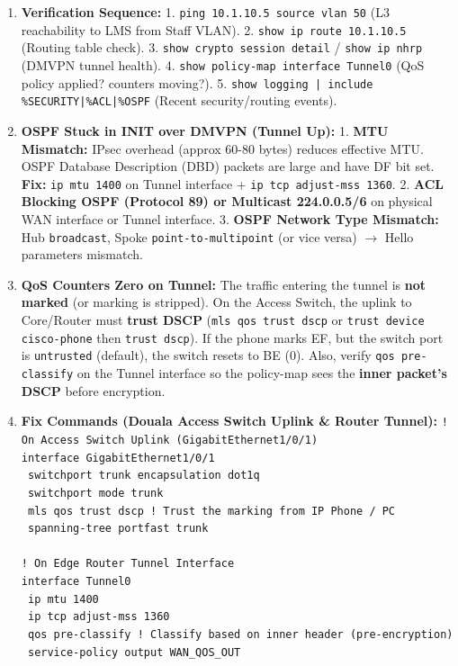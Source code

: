 \documentclass[11pt]{article}
\begin{document}
\begin{corrige}
\begin{enumerate}
    \item \textbf{Verification Sequence:}
        1. \texttt{ping 10.1.10.5 source vlan 50} (L3 reachability to LMS from Staff VLAN).
        2. \texttt{show ip route 10.1.10.5} (Routing table check).
        3. \texttt{show crypto session detail} / \texttt{show ip nhrp} (DMVPN tunnel health).
        4. \texttt{show policy-map interface Tunnel0} (QoS policy applied? counters moving?).
        5. \texttt{show logging | include \%SECURITY|\%ACL|\%OSPF} (Recent security/routing events).
    \item \textbf{OSPF Stuck in INIT over DMVPN (Tunnel Up):}
        1. \textbf{MTU Mismatch:} IPsec overhead (approx 60-80 bytes) reduces effective MTU. OSPF Database Description (DBD) packets are large and have DF bit set. \textbf{Fix:} \texttt{ip mtu 1400} on Tunnel interface + \texttt{ip tcp adjust-mss 1360}.
        2. \textbf{ACL Blocking OSPF (Protocol 89) or Multicast 224.0.0.5/6} on physical WAN interface or Tunnel interface.
        3. \textbf{OSPF Network Type Mismatch:} Hub \texttt{broadcast}, Spoke \texttt{point-to-multipoint} (or vice versa) $\rightarrow$ Hello parameters mismatch.
    \item \textbf{QoS Counters Zero on Tunnel:}
        The traffic entering the tunnel is \textbf{not marked} (or marking is stripped). On the Access Switch, the uplink to Core/Router must \textbf{trust DSCP} (\texttt{mls qos trust dscp} or \texttt{trust device cisco-phone} then \texttt{trust dscp}). If the phone marks EF, but the switch port is \texttt{untrusted} (default), the switch resets to BE (0). Also, verify \texttt{qos pre-classify} on the Tunnel interface so the policy-map sees the \textbf{inner packet's DSCP} before encryption.
    \item \textbf{Fix Commands (Douala Access Switch Uplink \& Router Tunnel):}
\texttt{! On Access Switch Uplink (GigabitEthernet1/0/1)}\\
\texttt{interface GigabitEthernet1/0/1}\\
\texttt{ switchport trunk encapsulation dot1q}\\
\texttt{ switchport mode trunk}\\
\texttt{ mls qos trust dscp          ! Trust the marking from IP Phone / PC}\\
\texttt{ spanning-tree portfast trunk}\\
\\
\texttt{! On Edge Router Tunnel Interface}\\
\texttt{interface Tunnel0}\\
\texttt{ ip mtu 1400}\\
\texttt{ ip tcp adjust-mss 1360}\\
\texttt{ qos pre-classify            ! Classify based on inner header (pre-encryption)}\\
\texttt{ service-policy output WAN\_QOS\_OUT}
\end{enumerate}
\end{corrige}
\end{document}
